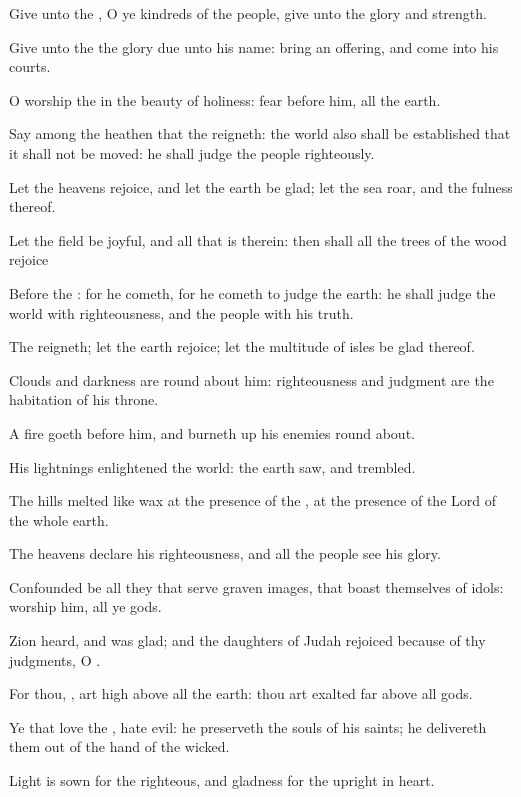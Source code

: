 \Verse Give unto the \LORD, O ye kindreds of the people, give unto the \LORD glory and strength.

\Verse Give unto the \LORD the glory due unto his name: bring an offering, and come into his courts.

\Verse O worship the \LORD in the beauty of holiness: fear before him, all the earth.

\Verse Say among the heathen that the \LORD reigneth: the world also shall be established that it shall not be moved: he shall judge the people righteously.

\Verse Let the heavens rejoice, and let the earth be glad; let the sea roar, and the fulness thereof.

\Verse Let the field be joyful, and all that is therein: then shall all the trees of the wood rejoice

\Verse Before the \LORD: for he cometh, for he cometh to judge the earth: he shall judge the world with righteousness, and the people with his truth.




\Chapter
\Verse The \LORD reigneth; let the earth rejoice; let the multitude of isles be glad thereof.

\Verse Clouds and darkness are round about him: righteousness and judgment are the habitation of his throne.

\Verse A fire goeth before him, and burneth up his enemies round about.

\Verse His lightnings enlightened the world: the earth saw, and trembled.

\Verse The hills melted like wax at the presence of the \LORD, at the presence of the Lord of the whole earth.

\Verse The heavens declare his righteousness, and all the people see his glory.

\Verse Confounded be all they that serve graven images, that boast themselves of idols: worship him, all ye gods.

\Verse Zion heard, and was glad; and the daughters of Judah rejoiced because of thy judgments, O \LORD.

\Verse For thou, \LORD, art high above all the earth: thou art exalted far above all gods.

\Verse Ye that love the \LORD, hate evil: he preserveth the souls of his saints; he delivereth them out of the hand of the wicked.

\Verse Light is sown for the righteous, and gladness for the upright in heart.

